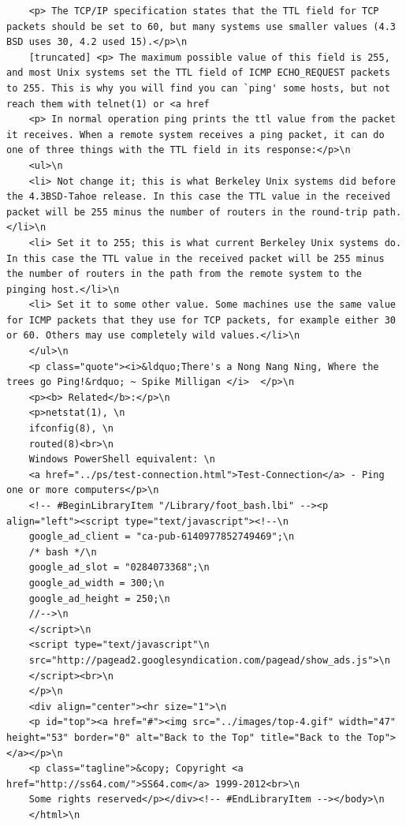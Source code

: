 \documentclass[12pt]{article} %
\begin{document}
\begin{verbatim}
    <p> The TCP/IP specification states that the TTL field for TCP packets should be set to 60, but many systems use smaller values (4.3 BSD uses 30, 4.2 used 15).</p>\n
    [truncated] <p> The maximum possible value of this field is 255, and most Unix systems set the TTL field of ICMP ECHO_REQUEST packets to 255. This is why you will find you can `ping' some hosts, but not reach them with telnet(1) or <a href
    <p> In normal operation ping prints the ttl value from the packet it receives. When a remote system receives a ping packet, it can do one of three things with the TTL field in its response:</p>\n
    <ul>\n
    <li> Not change it; this is what Berkeley Unix systems did before the 4.3BSD-Tahoe release. In this case the TTL value in the received packet will be 255 minus the number of routers in the round-trip path.</li>\n
    <li> Set it to 255; this is what current Berkeley Unix systems do. In this case the TTL value in the received packet will be 255 minus the number of routers in the path from the remote system to the pinging host.</li>\n
    <li> Set it to some other value. Some machines use the same value for ICMP packets that they use for TCP packets, for example either 30 or 60. Others may use completely wild values.</li>\n
    </ul>\n
    <p class="quote"><i>&ldquo;There's a Nong Nang Ning, Where the trees go Ping!&rdquo; ~ Spike Milligan </i>  </p>\n
    <p><b> Related</b>:</p>\n
    <p>netstat(1), \n
    ifconfig(8), \n
    routed(8)<br>\n
    Windows PowerShell equivalent: \n
    <a href="../ps/test-connection.html">Test-Connection</a> - Ping one or more computers</p>\n
    <!-- #BeginLibraryItem "/Library/foot_bash.lbi" --><p align="left"><script type="text/javascript"><!--\n
    google_ad_client = "ca-pub-6140977852749469";\n
    /* bash */\n
    google_ad_slot = "0284073368";\n
    google_ad_width = 300;\n
    google_ad_height = 250;\n
    //-->\n
    </script>\n
    <script type="text/javascript"\n
    src="http://pagead2.googlesyndication.com/pagead/show_ads.js">\n
    </script><br>\n
    </p>\n
    <div align="center"><hr size="1">\n
    <p id="top"><a href="#"><img src="../images/top-4.gif" width="47" height="53" border="0" alt="Back to the Top" title="Back to the Top"></a></p>\n
    <p class="tagline">&copy; Copyright <a href="http://ss64.com/">SS64.com</a> 1999-2012<br>\n
    Some rights reserved</p></div><!-- #EndLibraryItem --></body>\n
    </html>\n
    \end{verbatim}
\end{document}
